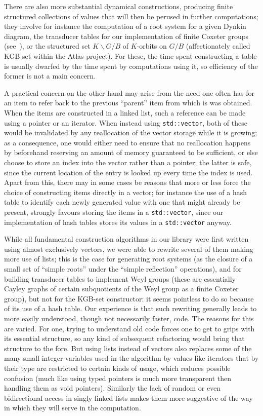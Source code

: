 \documentclass[12pt]{article}
\theoremstyle{plain}
\theoremstyle{definition}
\newcommand\std[1]{\texttt{std::#1}}
\def\vect.{\std{vector}}
\begin{document}
There are also more substantial dynamical constructions, producing finite
structured collections of values that will then be perused in further
computations; they involve for instance the computation of a root system for a
given Dynkin diagram, the transducer tables for our implementation of finite
Coxeter groups (see~\cite{Fokko transducer}), or the structured set
$K\backslash{G/B}$ of $K$-orbits on $G/B$ (affectionately called KGB-set within
the Atlas project). For these, the time spent constructing a table is usually
dwarfed by the time spent by computations using it, so efficiency of the former
is not a main concern.

A practical concern on the other hand may arise from the need one often has for
an item to refer back to the previous ``parent'' item from which is was
obtained. When the items are constructed in a linked list, such a reference can
be made using a pointer or an iterator. When instead using \vect., both of these
would be invalidated by any reallocation of the vector storage while it is
growing; as a consequence, one would either need to ensure that no reallocation
happens by beforehand reserving an amount of memory guaranteed to be sufficient,
or else choose to store an index into the vector rather than a pointer; the
latter is safe, since the current location of the entry is looked up every time
the index is used. Apart from this, there may in some cases be reasons that more
or less force the choice of constructing items directly in a vector; for
instance the use of a hash table to identify each newly generated value with one
that might already be present, strongly favours storing the items in a \vect.,
since our implementation of hash tables stores its values in a \vect. anyway.

While all fundamental construction algorithms in our library were first written
using almost exclusively vectors, we were able to rewrite several of them making
more use of lists; this is the case for generating root systems (as the closure
of a small set of ``simple roots'' under the ``simple reflection'' operations),
and for building transducer tables to implement Weyl groups (these are
essentially Cayley graphs of certain subquotients of the Weyl group as a finite
Coxeter group), but not for the KGB-set constructor: it seems pointless to do so
because of its use of a hash table. Our experience is that such rewriting
generally leads to more easily understood, though not necessarily faster, code.
The reasons for this are varied. For one, trying to understand old code forces
one to get to grips with its essential structure, so any kind of subsequent
refactoring would bring that structure to the fore. But using lists instead of
vectors also replaces some of the many small integer variables used in the
algorithm by values like iterators that by their type are restricted to certain
kinds of usage, which reduces possible confusion (much like using typed pointers
is much more transparent then handling them as void pointers). Similarly the
lack of random or even bidirectional access in singly linked lists makes them
more suggestive of the way in which they will serve in the computation.
\end{document}
